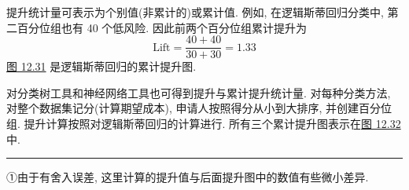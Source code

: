 提升统计量可表示为个别值(非累计的)或累计值. 例如, 在逻辑斯蒂回归分类中, 第二百分位组也有 40 个低风险. 因此前两个百分位组累计提升为
\[
\mathrm{Lift}=\frac{40+40}{30+30}=1.33
\]
\hyperref[fig:12.31]{图 12.31} 是逻辑斯蒂回归的累计提升图.

对分类树工具和神经网络工具也可得到提升与累计提升统计量. 对每种分类方法, 对整个数据集记分(计算期望成本), 申请人按照得分从小到大排序, 并创建百分位组. 提升计算按照对逻辑斯蒂回归的计算进行. 所有三个累计提升图表示在\hyperref[fig:12.32]{图 12.32} 中.

\vspace{6pt}
\noindent\rule{\linewidth}{0.4pt}
\par\vspace{2pt}
{\noindent ①\quad 由于有舍入误差, 这里计算的提升值与后面提升图中的数值有些微小差异.\par}
